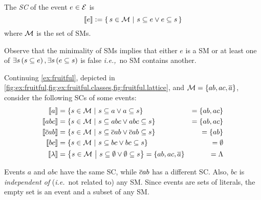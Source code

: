 \documentclass[x11names]{tlp}
\begin{document}
The \textit{\acf{SC}} of the event $e\in \EVENTSset$ is
\begin{equation}
	\stablecore{e} := \set{\, s \in \MODELset \given s \subseteq e \vee e \subseteq s\, } \label{eq:stable.core}
\end{equation}
where $\MODELset$ is the set of \aclp{SM}.

Observe that the minimality of \aclp{SM} implies that either $e$ is a
\acl{SM} or at least one of $\exists s \del{s \subseteq e}, \exists s \del{e
		\subseteq s}$ is false \emph{i.e.,}\ no \acl{SM} contains another.

\ifExamples
	\begin{example}
		\label{ex:stable.cores}
		\em

		Continuing \cref{ex:fruitful}, depicted in
		\cref{fig:ex:fruitful,fig:ex:fruitful.classes,fig:fruitful.lattice}, and
		$\MODELset = \set{ab, ac, \co{a}}$, consider the following \aclp{SC} of some
		events:
		\begin{equation*}
			\begin{aligned}
				\stablecore{a}           & = \set{s \in \MODELset \given s \subseteq a \vee a \subseteq s}                                        & = \set{ab, ac}      %
				\\
				\stablecore{abc}         & = \set{s \in \MODELset \given s \subseteq abc \vee abc \subseteq s}                                    & = \set{ab, ac}      %
				\\
				\stablecore{\co{c}ab}    & = \set{s \in \MODELset \given s \subseteq \co{c}ab \vee \co{c}ab \subseteq s}                          & = \set{ab}          %
				\\
				\stablecore{bc}          & = \set{s \in \MODELset \given s \subseteq bc \vee bc \subseteq s}                                      & = \emptyset         %
				\\
				\stablecore{\emptyevent} & = \set{s \in \MODELset \given s \subseteq \emptyset \vee \emptyset \subseteq s} = \set{ab, ac, \co{a}} & = \consequenceclass %
				\\
			\end{aligned}
		\end{equation*}

		Events $a$ and $abc$ have the same \ac{SC}, while $\overline{c}ab$ has a different
		\ac{SC}. Also, $bc$ is \emph{independent of} (\emph{i.e.}\ not related to)
		any \acl{SM}. Since events are sets of literals, the empty set is an event
		and a subset of any \ac{SM}.
	\end{example}
\fi
\end{document}
